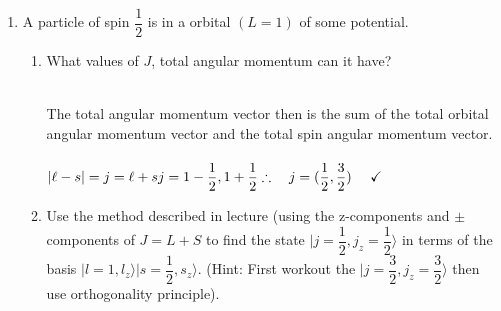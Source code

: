 \documentclass[fleqn]{article}
\begin{document}
  \begin{enumerate}
    \item A particle of spin $\dfrac{1}{2}$ is in a orbital $(L=1)$ of some potential.
    \begin{enumerate}
      \item What values of $J$, total angular momentum can it have?

        \textcolor{hwColor}{
          \\
          The total angular momentum vector then is the sum of the total orbital angular momentum vector and 
          the total spin angular momentum vector. 
          \\
          \\
          $
            |\ell-s|=j=\ell+s
            \\
            \\
            j=1-\dfrac{1}{2},1+\dfrac{1}{2}
            \\
            \\
            \\
            \therefore ~~~ j=(\dfrac{1}{2}, \dfrac{3}{2}) ~~~~ \checkmark
            \\
          $
        }

      \item Use the method described in lecture (using the z-components and $\pm$ components of $J=L+S$ to find the state 
      $\vert j=\dfrac{1}{2}, j_z=\dfrac{1}{2} \rangle$ in terms of the basis $\vert l=1,l_z \rangle \vert s=\dfrac{1}{2}, s_z \rangle$.
      (Hint: First workout the $\vert j=\dfrac{3}{2}, j_z=\dfrac{3}{2} \rangle$ then use orthogonality principle).


\end{enumerate}
\end{enumerate}
\end{document}
